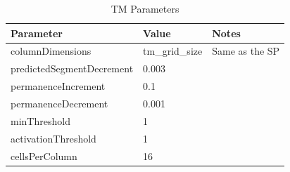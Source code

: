 \begin{table}[H]
    \centering
    \begin{tabularx}{\linewidth}{@{}XlX@{}}
        \toprule
        \textbf{Parameter}        & \textbf{Value} & \textbf{Notes} \\
        \midrule
        columnDimensions          & tm\_grid\_size & Same as the SP \\
        predictedSegmentDecrement & 0.003          &                \\
        permanenceIncrement       & 0.1            &                \\
        permanenceDecrement       & 0.001          &                \\
        minThreshold              & 1              &                \\
        activationThreshold       & 1              &                \\
        cellsPerColumn            & 16             &                \\
        \bottomrule
    \end{tabularx}
    \caption{TM Parameters}
    \label{tab:bb_tm_gridhtm_param}
\end{table}
\clearpage
